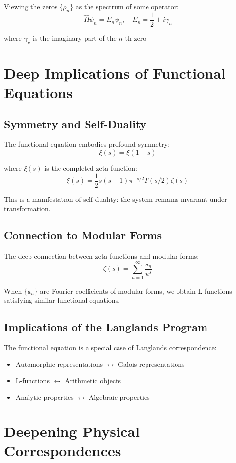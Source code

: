 \documentclass[11pt]{article}
\begin{document}
Viewing the zeros $\{\rho_n\}$ as the spectrum of some operator:
$$\hat{H} \psi_n = E_n \psi_n, \quad E_n = \frac{1}{2} + i\gamma_n$$

where $\gamma_n$ is the imaginary part of the $n$-th zero.

\section{Deep Implications of Functional Equations}

\subsection{Symmetry and Self-Duality}

The functional equation embodies profound symmetry:
$$\xi(s) = \xi(1-s)$$

where $\xi(s)$ is the completed zeta function:
$$\xi(s) = \frac{1}{2} s(s-1) \pi^{-s/2} \Gamma(s/2) \zeta(s)$$

This is a manifestation of self-duality: the system remains invariant under transformation.

\subsection{Connection to Modular Forms}

The deep connection between zeta functions and modular forms:
$$\zeta(s) = \sum_{n=1}^{\infty} \frac{a_n}{n^s}$$

When $\{a_n\}$ are Fourier coefficients of modular forms, we obtain L-functions satisfying similar functional equations.

\subsection{Implications of the Langlands Program}

The functional equation is a special case of Langlands correspondence:
\begin{itemize}
\item Automorphic representations $\leftrightarrow$ Galois representations
\item L-functions $\leftrightarrow$ Arithmetic objects
\item Analytic properties $\leftrightarrow$ Algebraic properties
\end{itemize}

\section{Deepening Physical Correspondences}
\end{document}
